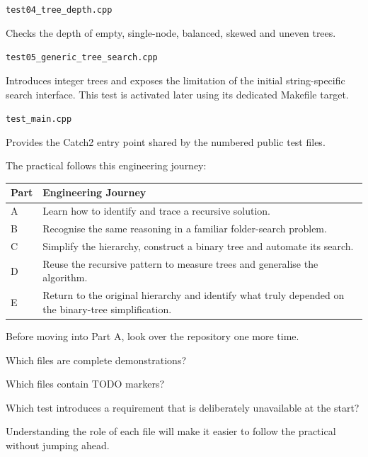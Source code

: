\documentclass{csc2059practical}
\begin{document}
\medskip

\noindent
\texttt{test04\_tree\_depth.cpp}

\smallskip

Checks the depth of empty, single-node, balanced, skewed and uneven trees.

\medskip

\noindent
\texttt{test05\_generic\_tree\_search.cpp}

\smallskip

Introduces integer trees and exposes the limitation of the initial
string-specific search interface. This test is activated later using its
dedicated Makefile target.

\medskip

\noindent
\texttt{test\_main.cpp}

\smallskip

Provides the Catch2 entry point shared by the numbered public test files.

The practical follows this engineering journey:

\begin{center}
\begin{tabular}{p{} p{}}
\toprule
\textbf{Part} & \textbf{Engineering Journey} \\
\midrule
A & Learn how to identify and trace a recursive solution. \\
B & Recognise the same reasoning in a familiar folder-search problem. \\
C & Simplify the hierarchy, construct a binary tree and automate its search. \\
D & Reuse the recursive pattern to measure trees and generalise the algorithm. \\
E & Return to the original hierarchy and identify what truly depended on the
    binary-tree simplification. \\
\bottomrule
\end{tabular}
\end{center}

\begin{reflectionbox}
Before moving into Part A, look over the repository one more time.

Which files are complete demonstrations?

Which files contain TODO markers?

Which test introduces a requirement that is deliberately unavailable at the
start?

Understanding the role of each file will make it easier to follow the practical
without jumping ahead.
\end{reflectionbox}
\end{document}
